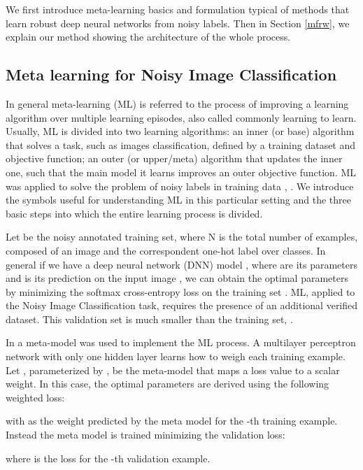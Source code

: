 \documentclass[runningheads]{llncs}
\begin{document}
	We first introduce meta-learning basics and formulation typical of methods that learn robust deep neural networks from noisy labels. Then in Section \ref{mfrw}, we explain our method showing the architecture of the whole process.
	
	\subsection{Meta learning for Noisy Image Classification}\label{back}
	
	In general meta-learning (ML) is referred to the process of improving a learning algorithm over multiple learning episodes, also called commonly learning to learn. Usually, ML is divided into two learning algorithms: an inner (or base) algorithm that solves a task, such as images classification, defined by a training dataset and objective function; an outer (or upper/meta) algorithm that updates the inner one, such that the main model it learns improves an outer objective function. ML was applied to solve the problem of noisy labels in training data \cite{ren2018learning}, \cite{shu2019meta}. We introduce the symbols useful for understanding ML in this particular setting and the three basic steps into which the entire learning process is divided.
	
	Let  be the noisy annotated training set, where N is the total number of examples, composed of an image  and the correspondent one-hot label  over  classes. In general if we have a deep neural network (DNN) model , where  are its parameters and  is its prediction on the input image , we can obtain the optimal parameters  by minimizing the softmax cross-entropy loss  on the training set . ML, applied to the Noisy Image Classification task, requires the presence of an additional verified dataset. This validation set  is much smaller than the training set, .
	
	In \cite{shu2019meta} a meta-model was used to implement the ML process. A multilayer perceptron network with only one hidden layer learns how to weigh each training example. Let , parameterized by , be the meta-model that maps a loss value to a scalar weight. In this case, the optimal parameters  are derived using the following weighted loss:
	
	
	with  as the weight predicted by the meta model for the -th training example. Instead the meta model is trained minimizing the validation loss:
	
	
	where  is the loss for the -th validation example.
	
\end{document}
